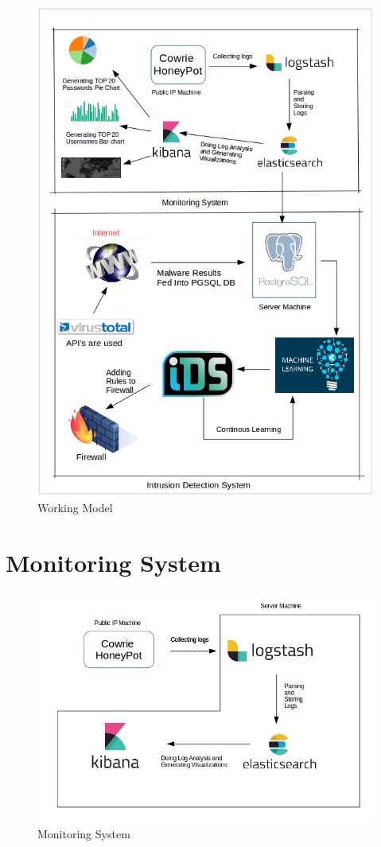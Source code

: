 \documentclass{article}
\begin{document}
\begin{figure}[H]
\centering
\caption{Working Model}
\includegraphics[scale=0.55]{Working_Model}
\end{figure}

\section{Monitoring System}

\begin{figure}[H]
\centering
\caption{Monitoring System}
\includegraphics[scale=0.55]{Monitoring_System}
\end{figure}
\end{document}
